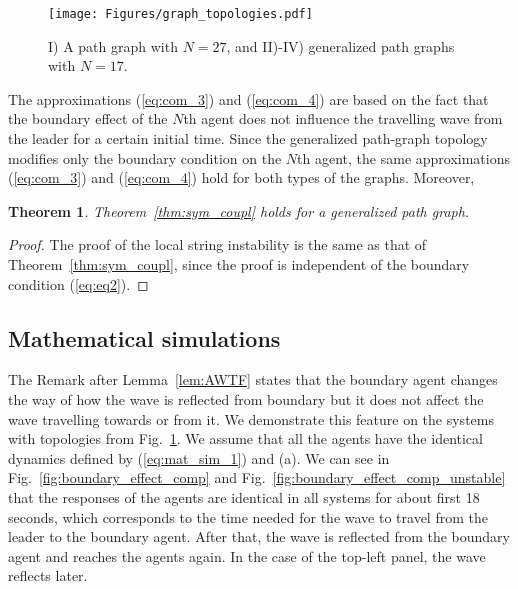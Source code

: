 \documentclass[10pt,twocolumn,twoside]{IEEEtran}
\newtheorem{theorem}{Theorem}
\theoremstyle{definition}
\newcommand{\revA}{Black}
\begin{document}
\begin{figure}[ht]
 \centering
  \texttt{[image: Figures/graph\_topologies.pdf]}
 \caption{{\color{\revA}I) A path graph with $N=27$, and II)-IV) generalized path graphs with $N=17$.}}
  \label{fig:graph_topologies}
\end{figure}

{\color{\revA}The approximations (\ref{eq:com_3}) and (\ref{eq:com_4}) are based on the fact that the boundary effect of the $N$th agent does not influence the travelling wave from the leader for a certain initial time. Since the generalized path-graph topology modifies only the boundary condition on the $N$th agent, the same approximations (\ref{eq:com_3}) and (\ref{eq:com_4}) hold for both types of the graphs. Moreover,
\begin{theorem}\label{thm:sym_coupl_generalized}
  Theorem~\ref{thm:sym_coupl} holds for a generalized path graph.
\end{theorem}
\begin{proof}
The proof of the local string instability is the same as that of Theorem~\ref{thm:sym_coupl}, since the proof is independent of the boundary condition (\ref{eq:eq2}).
\end{proof}}



















\subsection{Mathematical simulations}
The Remark after Lemma~\ref{lem:AWTF} states that the boundary agent changes the way of how the wave is reflected from boundary but it does not affect the wave travelling towards or from it. We demonstrate this feature on the systems with topologies from Fig.~\ref{fig:graph_topologies}. We assume that all the agents have the identical dynamics defined by (\ref{eq:mat_sim_1}) and (a). We can see in Fig.~\ref{fig:boundary_effect_comp} {\color{\revA}and Fig.~\ref{fig:boundary_effect_comp_unstable}} that the responses of the agents are identical in all systems for about first 18 seconds, which corresponds to the time needed for the wave to travel from the leader to the boundary agent. After that, the wave is reflected from the boundary agent and reaches the agents again. In the case of the top-left panel, the wave reflects later.
\end{document}
